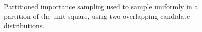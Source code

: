 \begin{figure}[!tb]
\centering
{}
\hspace{0.1in}
\caption[Sampling uniformly in a partioned unit square]{Partitioned importance sampling used to sample uniformly in a partition of the unit square, using two overlapping candidate distributions.}
\label{fig:pimp-sampling-2d}
\end{figure}

